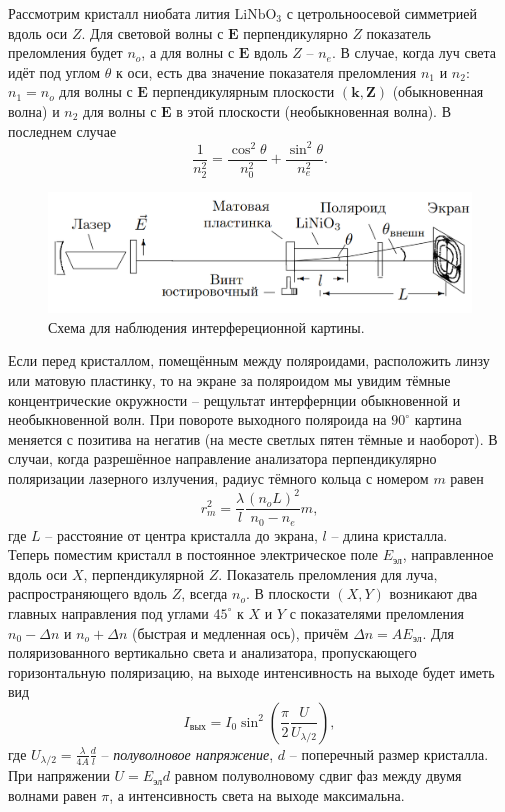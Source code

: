 \documentclass[a4paper, 12pt]{article}%
\begin{document}
	Рассмотрим кристалл ниобата лития $\text{LiNbO}_3$ с цетрольноосевой симметрией вдоль оси $Z$. Для световой волны с $\mathbf{E}$ перпендикулярно $Z$ показатель преломления будет $n_o$, а для волны с $\mathbf{E}$ вдоль $Z$ -- $n_e$. В случае, когда луч света идёт под углом $\theta$ к оси, есть два значение показателя преломления $n_1$ и $n_2$: $n_1 = n_o$ для волны с $\mathbf{E}$ перпендикулярным плоскости $(\mathbf{k},\mathbf{Z})$ (обыкновенная волна) и $n_2$ для волны с $\mathbf{E}$ в этой плоскости (необыкновенная волна). В последнем случае
	\begin{equation}
		\dfrac{1}{n_2^2}=\dfrac{\cos^2 \theta}{n_0^2}+\dfrac{\sin^2 \theta}{n_e^2}.
	\end{equation}
	
	 \begin{figure}[h]
		\includegraphics[scale=0.7]{1.png}
		\centering
		\caption{Схема для наблюдения интерфереционной картины.}
	\end{figure}

	Если перед кристаллом, помещённым между поляроидами, расположить линзу или матовую пластинку, то на экране за поляроидом мы увидим тёмные концентрические окружности -- рещультат интерфернции обыкновенной и необыкновенной волн. При повороте выходного поляроида на $90^\circ$ картина меняется с позитива на негатив (на месте светлых пятен тёмные и наоборот). В случаи, когда разрешённое направление анализатора перпендикулярно поляризации лазерного излучения, радиус тёмного кольца с номером $m$ равен
	\begin{equation}
		r_m^2 = \dfrac{\lambda}{l} \dfrac{(n_oL)^2}{n_0 - n_e}m,
	\end{equation}
	где $L$ -- расстояние от центра кристалла до экрана, $l$ -- длина кристалла.\\
	Теперь поместим кристалл в постоянное электрическое поле $E_{\text{эл}}$, направленное вдоль оси $X$, перпендикулярной $Z$. Показатель преломления для луча, распространяющего вдоль $Z$, всегда $n_o$. В плоскости $(X,Y)$ возникают два главных направления под углами $45^\circ$ к $X$ и $Y$ с показателями преломления $n_0 - \Delta n$ и $n_o + \Delta n$ (быстрая и медленная ось), причём $\Delta n = A E_{\text{эл}}$. Для поляризованного вертикально света и анализатора, пропускающего горизонтальную поляризацию, на выходе интенсивность на выходе будет иметь вид
	\begin{equation}
		I_{\text{вых}} = I_0 \sin^2 \left(\dfrac{\pi}{2} \dfrac{U}{U_{\lambda/2}} \right),
	\end{equation}
	где $U_{\lambda/2} = \frac{\lambda}{4A}\frac{d}{l}$ -- \textit{полуволновое напряжение}, $d$ -- поперечный размер кристалла.  При напряжении $U = E_{\text{эл}}d$ равном полуволновому сдвиг фаз между двумя волнами равен $\pi$, а интенсивность света на выходе максимальна. 
	
\end{document}
